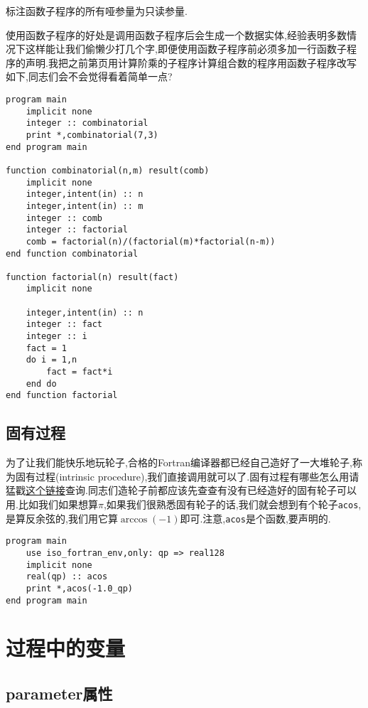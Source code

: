 \begin{convention}
    标注函数子程序的所有哑参量为只读参量.
\end{convention}

使用函数子程序的好处是调用函数子程序后会生成一个数据实体,经验表明多数情况下这样能让我们偷懒少打几个字,即便使用函数子程序前必须多加一行函数子程序的声明.我把之前第\pageref{fact_comb}页用计算阶乘的子程序计算组合数的程序用函数子程序改写如下,同志们会不会觉得看着简单一点?
\begin{lstlisting}
program main
    implicit none
    integer :: combinatorial
    print *,combinatorial(7,3)
end program main

function combinatorial(n,m) result(comb)
    implicit none
    integer,intent(in) :: n
    integer,intent(in) :: m
    integer :: comb
    integer :: factorial
    comb = factorial(n)/(factorial(m)*factorial(n-m))
end function combinatorial

function factorial(n) result(fact)
    implicit none

    integer,intent(in) :: n
    integer :: fact
    integer :: i
    fact = 1
    do i = 1,n
        fact = fact*i
    end do
end function factorial
\end{lstlisting}

\subsection{固有过程}

\newcommand{\ip}[1]{\href{https://fortranwiki.org/fortran/show/#1}{\texttt{#1}}}
为了让我们能快乐地玩轮子,合格的Fortran编译器都已经自己造好了一大堆轮子,称为固有过程(intrinsic procedure),我们直接调用就可以了.固有过程有哪些怎么用请猛戳\href{https://fortranwiki.org/fortran/show/Intrinsic+procedures}{这个链接}查询.同志们造轮子前都应该先查查有没有已经造好的固有轮子可以用.比如我们如果想算$\pi$,如果我们很熟悉固有轮子的话,我们就会想到有个轮子\texttt{acos},是算反余弦的,我们用它算$\arccos (-1)$即可.注意,\texttt{acos}是个函数,要声明的.
\begin{lstlisting}
program main
    use iso_fortran_env,only: qp => real128
    implicit none
    real(qp) :: acos
    print *,acos(-1.0_qp)
end program main
\end{lstlisting}

\section{过程中的变量}

\subsection{parameter属性}\label{fortran_parameter}


